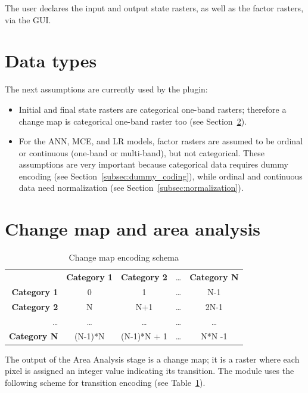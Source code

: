 \documentclass{report}
\begin{document}
The user declares the input and output state rasters, as well as the factor rasters, via the GUI.

\section{Data types}

The next assumptions are currently used by the plugin:
\begin{itemize}
    \item Initial and final state rasters are categorical one-band rasters; therefore a change map is categorical one-band raster too (see Section~\ref{sec:changemap_encoding}).
    \item For the ANN, MCE, and LR models, factor rasters are assumed to be ordinal or continuous (one-band or multi-band), but not categorical.
      These assumptions are very important because categorical data requires dummy encoding (see Section~\ref{subsec:dummy_coding}),
      while ordinal and continuous data need normalization (see Section~\ref{subsec:normalization}).
\end{itemize}
    
\section{Change map and area analysis}\label{sec:changemap_encoding}

\begin{table}[]
\centering
\caption{Change map encoding schema}
\begin{tabular}{rcccc}
           & \bf{Category 1} & \bf{Category 2} & \dots & \bf{Category N} \\
\bf{Category 1} & 0          & 1          & \dots  & N-1          \\
\bf{Category 2} &  N         & N+1        & \dots  & 2N-1       \\
 \dots     &  \dots     &   \dots    & \dots  &   \dots  \\
\bf{Category N} &  (N-1)*N   & (N-1)*N + 1 & \dots  &  N*N -1          
\end{tabular}
\label{tab:changemap_encoding}
\end{table}

The output of the Area Analysis stage is a change map; it is a raster where each pixel is assigned an integer value indicating its transition.
The module uses the following scheme for transition encoding (see Table~\ref{tab:changemap_encoding}).
\end{document}
